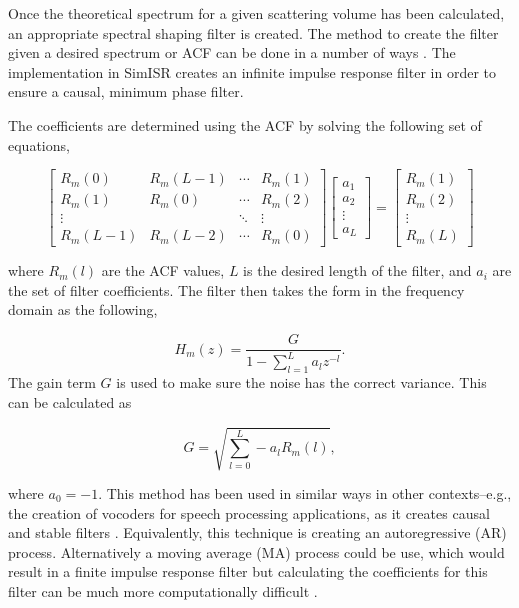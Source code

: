 \documentclass[draft,ras]{agutex}
\begin{document}
\begin{article}
Once the theoretical spectrum for a given scattering volume has been calculated, an appropriate spectral shaping filter is created. The method to create the filter given a desired spectrum or ACF can be done in a number of ways \citep{Kasdin:1995wi}. The implementation in SimISR creates an infinite impulse response filter in order to ensure a causal, minimum phase filter. 

The coefficients are determined using the ACF by solving the following set of equations,

\begin{equation}
\label{eq:filtereq}
\begin{bmatrix} R_m(0) & R_m(L-1)& \cdots & R_m(1) \\ 
R_m(1) & R_m(0)& \cdots & R_m(2)\\ 
\vdots & &\ddots  & \vdots \\  
R_m(L-1) & R_m(L-2) & \cdots & R_m(0) 
\end{bmatrix}
 \left[ \begin{array}{c} a_1\\ a_2\\\vdots \\ a_L \end{array} \right]=\left[ \begin{array}{c} R_m(1) \\ R_m(2)\\ \vdots \\R_m(L) \end{array} \right]
\end{equation}

\noindent where $R_m(l)$ are the ACF values, $L$ is the desired length of the filter, and $ a_i$ are the set of filter coefficients. The filter then takes the form in the frequency domain as the following,

\begin{equation}
\label{eq:filtz}
H_m(z) = \frac{G}{1-\displaystyle \sum_{l=1}^{L} a_l z^{-l}}.
\end{equation}
\noindent The gain term $G$ is used to make sure the noise has the correct variance. This can be calculated as 

\begin{equation}
\label{eq:gainterm}
G=\sqrt{\displaystyle \sum_{l=0}^L -a_l R_m(l)},
\end{equation}

\noindent where $a_0=-1$. This method has been used in similar ways in other contexts--e.g., the creation of vocoders for speech processing applications, as it creates causal and stable filters \citep{rabinerdigitalspeech}. Equivalently, this technique is creating an autoregressive (AR) process. Alternatively a moving average (MA) process could be use, which would result in a finite impulse response filter but calculating the coefficients for this filter can be much more computationally difficult \citep{kayvol1}.


\end{article}
\end{document}
